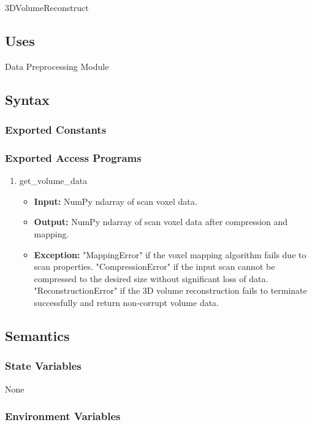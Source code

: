 \documentclass[12pt, titlepage]{article}
\begin{document}
3DVolumeReconstruct

\subsection{Uses}
Data Preprocessing Module

\subsection{Syntax}

\subsubsection{Exported Constants}

\subsubsection{Exported Access Programs}

\begin{enumerate}
  \item get\_volume\_data
        \begin{itemize}
          \item \textbf{Input:} NumPy ndarray of scan voxel data.
          \item \textbf{Output:} NumPy ndarray of scan voxel data after compression and mapping.
          \item \textbf{Exception:} "MappingError" if the voxel mapping algorithm fails due to scan properties.
                "CompressionError" if the input scan cannot be compressed to the desired size without significant loss of data.
                "ReconstructionError" if the 3D volume reconstruction fails to terminate successfully and return non-corrupt volume data.
        \end{itemize}
\end{enumerate}


\subsection{Semantics}

\subsubsection{State Variables}

None

\subsubsection{Environment Variables}
\end{document}
